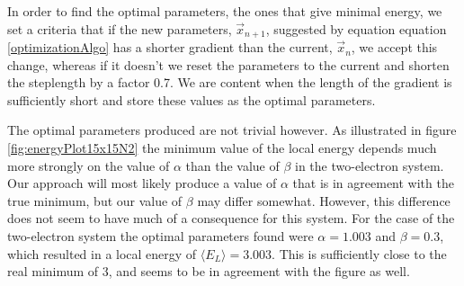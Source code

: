 \documentclass[english, a4paper]{article}
\newcommand\bk[1]{\langle#1\rangle}
\begin{document}
	
	In order to find the optimal parameters, the ones that give minimal energy, we set a criteria that if the new parameters, $\vec{x}_{n+1}$, suggested by equation equation \ref{optimizationAlgo} has a shorter gradient than the current, $\vec{x}_n$, we accept this change, whereas if it doesn't we reset the parameters to the current and shorten the steplength by a factor 0.7. We are content when the length of the gradient is sufficiently short and store these values as the optimal parameters. 
	
	The optimal parameters produced are not trivial however. As illustrated in figure \ref{fig:energyPlot15x15N2} the minimum value of the local energy depends much more strongly on the value of $\alpha$ than the value of $\beta$ in the two-electron system. Our approach will most likely produce a value of $\alpha$ that is in agreement with the true minimum, but our value of $\beta$ may differ somewhat. However, this difference does not seem to have much of a consequence for this system. For the case of the two-electron system the optimal parameters found were $\alpha=1.003$ and $\beta=0.3$, which resulted in a local energy of $\bk{E_L} = 3.003$. This is sufficiently close to the real minimum of 3, and seems to be in agreement with the figure as well.
	
	
	
\end{document}
